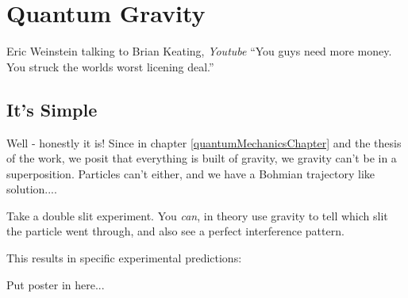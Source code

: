 \documentclass[../rzero]{subfiles}
\begin{document}
\chapter{Quantum Gravity}\label{quantumGravityChapter}

\begin{chapquote}{Eric Weinstein talking to Brian Keating, \textit{Youtube\cite{drbriankeatingEricWeinsteinTheoretical2020}}}
``You guys need more money. You struck the worlds worst licening deal.''
\end{chapquote}


\section{It's Simple}
Well - honestly it is! Since in chapter \ref{quantumMechanicsChapter} and the thesis of the work, we posit that everything is built of gravity, we gravity can't be in a superposition. Particles can't either, and we have a Bohmian trajectory like solution....

Take a double slit experiment. You \textit{can}, in theory use gravity to tell which slit the particle went through, and also see a perfect interference pattern.



This results in specific experimental predictions: 
 

Put poster in here... 
\end{document}
